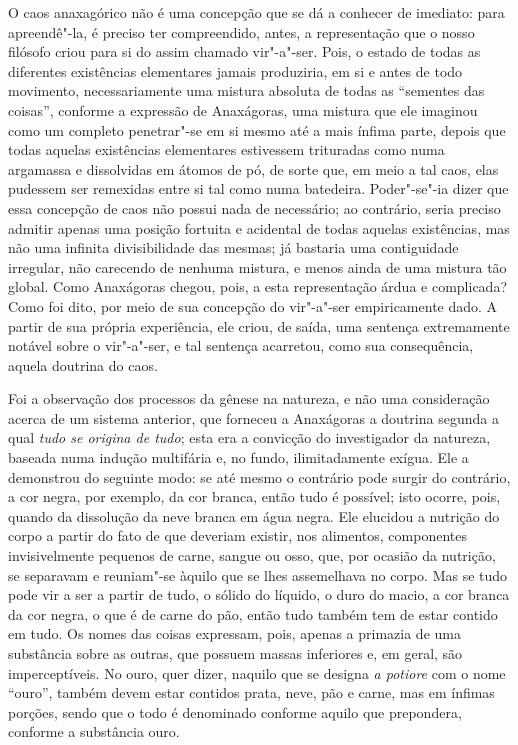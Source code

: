 \sectionitem

O caos anaxagórico não é uma concepção que se dá a conhecer de imediato:
para apreendê"-la, é preciso ter compreendido, antes, a representação
que o nosso filósofo criou para si do assim chamado vir"-a"-ser. Pois, o
estado de todas as diferentes existências elementares jamais
produziria, em si e antes de todo movimento, necessariamente uma
mistura absoluta de todas as ``sementes das coisas'', conforme a
expressão de Anaxágoras, uma mistura que ele imaginou como um completo \label{mistura}
penetrar"-se em si mesmo até a mais ínfima parte, depois que todas
aquelas existências elementares estivessem trituradas como numa
argamassa e dissolvidas em átomos de pó, de sorte que, em meio a tal
caos, elas pudessem ser remexidas entre si tal como numa batedeira.
Poder"-se"-ia dizer que essa concepção de caos não possui nada de
necessário; ao contrário, seria preciso admitir apenas uma posição
fortuita e acidental de todas aquelas existências, mas não uma infinita
divisibilidade das mesmas; já bastaria uma contiguidade irregular, não
carecendo de nenhuma mistura, e menos ainda de uma mistura tão global.
Como Anaxágoras chegou, pois, a esta representação árdua e complicada?
Como foi dito, por meio de sua concepção do vir"-a"-ser empiricamente
dado. A partir de sua própria experiência, ele criou, de saída, uma
sentença extremamente notável sobre o vir"-a"-ser, e tal sentença
acarretou, como sua consequência, aquela doutrina do caos.

Foi a observação dos processos da gênese na natureza, e não uma
consideração acerca de um sistema anterior, que forneceu a Anaxágoras a
doutrina segunda a qual \textit{tudo se origina de tudo}; esta era a
convicção do investigador da natureza, baseada numa indução multifária
e, no fundo, ilimitadamente exígua. Ele a demonstrou do seguinte modo:
se até mesmo o contrário pode surgir do contrário, a cor negra, por
exemplo, da cor branca, então tudo é possível; isto ocorre, pois,
quando da dissolução da neve branca em água negra. Ele elucidou a
nutrição do corpo a partir do fato de que deveriam existir, nos
alimentos, componentes invisivelmente pequenos de carne, sangue ou
osso, que, por ocasião da nutrição, se separavam e reuniam"-se àquilo
que se lhes assemelhava no corpo. Mas se tudo pode vir a ser a partir
de tudo, o sólido do líquido, o duro do macio, a cor branca da cor
negra, o que é de carne do pão, então tudo também tem de estar contido
em tudo. Os nomes das coisas expressam, pois, apenas a primazia de uma
substância sobre as outras, que possuem massas inferiores e, em geral,
são imperceptíveis. No ouro, quer dizer, naquilo que se designa
\textit{a potiore} com o nome ``ouro'', também devem estar contidos prata,
neve, pão e carne, mas em ínfimas porções, sendo que o todo é
denominado conforme aquilo que prepondera, conforme a substância ouro.


